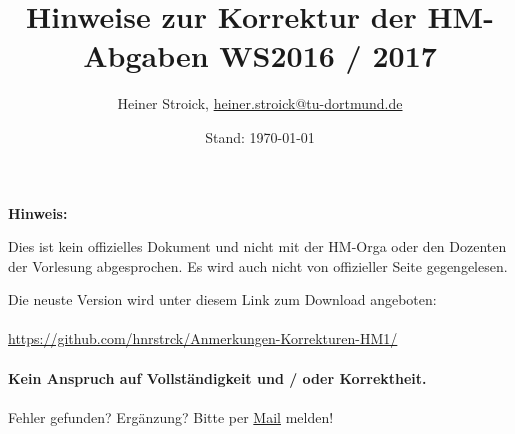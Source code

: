 \documentclass[11pt, a4paper]{article}
\title{Hinweise zur Korrektur der HM\RM{1}-Abgaben WS2016 / 2017}
\author{Heiner Stroick, \href{mailto:heiner.stroick@tu-dortmund.de}{heiner.stroick@tu-dortmund.de}}
\date{Stand: \today}
\begin{document}
\maketitle

\begin{mdframed}[linecolor=red]
\begin{center}
{\footnotesize \textbf{Hinweis:} 

Dies ist kein offizielles Dokument und nicht mit der HM-Orga oder den Dozenten der Vorlesung abgesprochen. Es wird auch nicht von offizieller Seite gegengelesen. 

Die neuste Version wird unter diesem Link zum Download angeboten:\\
~\\
\url{https://github.com/hnrstrck/Anmerkungen-Korrekturen-HM1/}\\
~\\
\textcolor[rgb]{1,0,0}{\textbf{Kein Anspruch auf Vollständigkeit und / oder Korrektheit.}}\\
~\\
\textcolor[rgb]{0,0,1}{Fehler gefunden? Ergänzung? Bitte per \href{mailto:heiner.stroick@tu-dortmund.de}{Mail} melden!}}
\end{center}
\end{mdframed}
\end{document}
